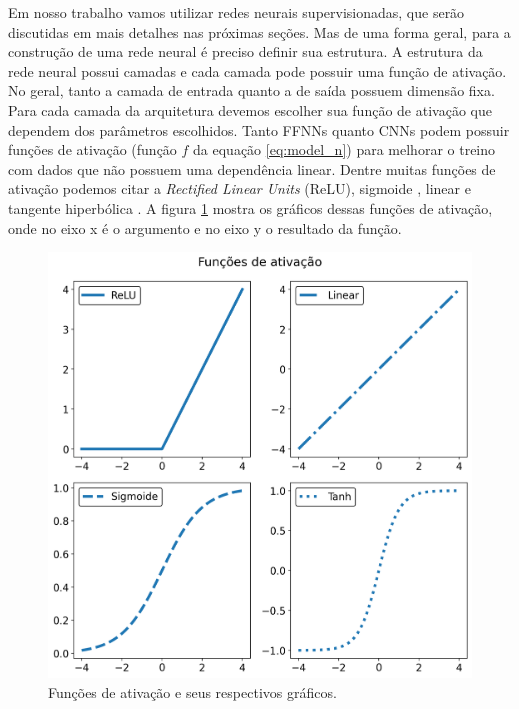 \documentclass[a4paper,12pt,oneside]{book}
\begin{document}
\par Em nosso trabalho vamos utilizar redes neurais supervisionadas, que serão discutidas em mais detalhes nas próximas seções. Mas de uma forma geral, para a construção de uma rede neural é preciso definir sua estrutura. A estrutura da rede neural possui camadas e cada camada pode possuir uma função de ativação. No geral, tanto a camada de entrada quanto a de saída possuem dimensão fixa. Para cada camada da arquitetura devemos escolher sua função de ativação que dependem dos parâmetros escolhidos. Tanto FFNNs quanto CNNs podem possuir funções de ativação (função $f$ da equação \ref{eq:model_n}) para melhorar o treino com dados que não possuem uma dependência linear. Dentre muitas funções de ativação podemos citar a \textit{Rectified Linear Units} (ReLU)\cite{RELU}, sigmoide \cite{sigmoid_act}, linear e tangente hiperbólica \cite{act_comp}. A figura \ref{fig:ativacoes} mostra os gráficos dessas funções de ativação, onde no eixo x é o argumento e no eixo y o resultado da função.
\begin{figure}[H]
    \centering
    \includegraphics[width=0.8\columnwidth]{figs/ativacoes.png}
    \caption{Funções de ativação e seus respectivos gráficos.}
    \label{fig:ativacoes}
\end{figure}
\end{document}
